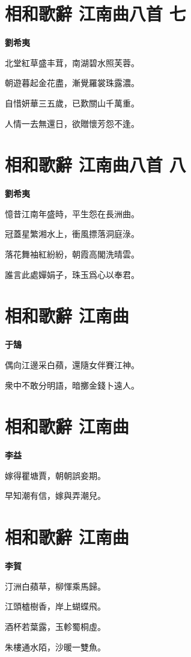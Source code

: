 \documentclass[12pt,a4paper]{ctexbook}
\begin{document}
\section{相和歌辭 江南曲八首 七}
\textbf{劉希夷}\par\vspace{0.5em}
北堂紅草盛丰茸，南湖碧水照芙蓉。\par
朝遊暮起金花盡，漸覺羅裳珠露濃。\par
自惜妍華三五歲，已歎關山千萬重。\par
人情一去無還日，欲贈懷芳怨不逢。\par

\section{相和歌辭 江南曲八首 八}
\textbf{劉希夷}\par\vspace{0.5em}
憶昔江南年盛時，平生怨在長洲曲。\par
冠蓋星繁湘水上，衝風摽落洞庭淥。\par
落花舞袖紅紛紛，朝霞高閣洗晴雲。\par
誰言此處嬋娟子，珠玉爲心以奉君。\par

\section{相和歌辭 江南曲}
\textbf{于鵠}\par\vspace{0.5em}
偶向江邊采白蘋，還隨女伴賽江神。\par
衆中不敢分明語，暗擲金錢卜遠人。\par

\section{相和歌辭 江南曲}
\textbf{李益}\par\vspace{0.5em}
嫁得瞿塘賈，朝朝誤妾期。\par
早知潮有信，嫁與弄潮兒。\par

\section{相和歌辭 江南曲}
\textbf{李賀}\par\vspace{0.5em}
汀洲白蘋草，柳惲乘馬歸。\par
江頭樝樹香，岸上蝴蝶飛。\par
酒杯若葉露，玉軫蜀桐虛。\par
朱樓通水陌，沙暖一雙魚。\par
\end{document}
